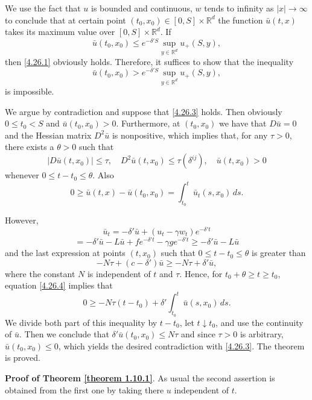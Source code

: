 \documentclass[reqno,12pt]{amsart}
\theoremstyle{definition}
\theoremstyle{remark}
\begin{document}
We use the fact that $u$ is bounded and continuous, $w$ tends to
infinity as
   $|x|\to\infty$ to conclude that   at certain point $(t_{0},x_{0})\in
[0,S]\times{\mathbb{R}}^{d}$ the function $\bar{u}(t,x)$ takes its maximum
value over $[0,S]\times{\mathbb{R}}^{d}$. If
$$
\bar{u}(t_{0},x_{0})\leq
    e^{-\delta' S}
\sup_{y\in{\mathbb{R}}^{d}}u_{+}(S,y),
$$
then \eqref{4.26.1}  obviously holds. Therefore, it suffices to
show that the inequality
\begin{equation}
                                             \label{4.26.3}
\bar{u}(t_{0},x_{0})>     e^{-\delta' S}
\sup_{y\in{\mathbb{R}}^{d}}u_{+}(S,y),
\end{equation}
is impossible.

We argue by contradiction and suppose   that \eqref{4.26.3} holds.
Then obviously $0\leq t_{0}<S$ and $\bar{u}(t_{0},x_{0})>0$.
Furthermore, at $(t_{0},x_{0})$ we have that $D\bar{u} =0$ and
the      Hessian   matrix $D^{2}\bar{u} $ is nonpositive, which
   implies that, for any $\tau>0$, there exists a
$\theta>0$ such that
$$
|D \bar{u} (t,x_{0})|\leq\tau,\quad D^{2}\bar{u} (t,x_{0})\leq\tau
(\delta^{ij}),\quad \bar{u} (t,x_{0})>0
$$
whenever $0\leq t-t_{0}\leq\theta$. Also
\begin{equation}
                                             \label{4.26.4}
0\geq \bar{u}(t,x)-\bar{u}(t_{0},x_{0})=
\int_{t_{0}}^{t}\bar{u}_{t}(s,x_{0})\,ds.
\end{equation}

However,
$$
\bar{u}_{t}=-\delta'\bar{u} +  (u_{t}-\gamma w_{t}) e^{-\delta't}
$$
$$
=-\delta' \bar{u} - L\bar{u}+fe^{-\delta't}-\gamma ge^{-\delta't}
\geq -\delta'\bar{u} - L\bar{u}
$$
and the last expression at points $(t,x_{0})$ such that $0\leq
t-t_{0} \leq\theta$ is greater than
$$
-N\tau+(c-\delta')\bar{u}\geq -N\tau+\delta'\bar{u},
$$
where the constant $N$ is independent of $t$ and $\tau$. Hence,
for   $ t_0 + \theta \ge t \geq t_{0}$, equation \eqref{4.26.4}
implies that
$$
0\geq-N\tau(t-t_{0})+\delta'\int_{t_{0}}^{t} \bar{u}(s,x_{0})\,ds.
$$
We divide both part of this inequality by $t-t_{0}$, let
$t\downarrow t_{0}$, and use the continuity of $\bar{u}$. Then we
conclude that $\delta'\bar{u}(t_{0},x_{0})\leq N\tau$ and since
$\tau>0$ is arbitrary, $\bar{u}(t_{0},x_{0})\leq0$, which yields
the desired contradiction with \eqref{4.26.3}. The theorem is
proved.

{\bf Proof of Theorem \ref{theorem 1.10.1}}. As usual the second
assertion is obtained from the first one by taking there $u$
independent of $t$.
\end{document}
